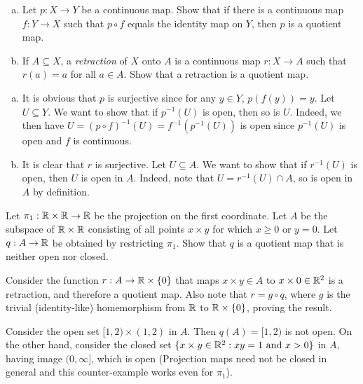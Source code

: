 	\setcounter{exercise}{1}
	\begin{exercise}
		\phantom{.}
		\begin{enumerate}[(a)]
			\item Let $p:X\to Y$ be a continuous map. Show that if there is a continuous map $f:Y\to X$ such that $p\circ f$ equals the identity map on $Y$, then $p$ is a quotient map.
			\item If $A\subseteq X$, a \textit{retraction} of $X$ onto $A$ is a continuous map $r:X\to A$ such that $r(a)=a$ for all $a\in A$. Show that a retraction is a quotient map.
		\end{enumerate}
	\end{exercise}
	\begin{solution*}
		\begin{enumerate}[(a)]
			\item It is obvious that $p$ is surjective since for any $y\in Y$, $p(f(y))=y$. Let $U\subseteq Y$. We want to show that if $p^{-1}(U)$ is open, then so is $U$. Indeed, we then have $U = (p\circ f)^{-1}(U) = f^{-1}(p^{-1}(U))$ is open since $p^{-1}(U)$ is open and $f$ is continuous.
			\item It is clear that $r$ is surjective. Let $U\subseteq A$. We want to show that if $r^{-1}(U)$ is open, then $U$ is open in $A$. Indeed, note that $U = r^{-1}(U) \cap A$, so is open in $A$ by definition.
		\end{enumerate}
	\end{solution*}

	\begin{exercise}
		Let $\pi_1:\mathbb{R}\times\mathbb{R}\to\mathbb{R}$ be the projection on the first coordinate. Let $A$ be the subspace of $\mathbb{R}\times\mathbb{R}$ consisting of all points $x\times y$ for which $x\geq 0$ or $y=0$. Let $q:A\to\mathbb{R}$ be obtained by restricting $\pi_1$. Show that $q$ is a quotient map that is neither open nor closed.
	\end{exercise}
	\begin{solution*}
		Consider the function $r:A\to \mathbb{R}\times\{0\}$ that maps $x\times y\in A$ to $x\times 0\in\mathbb{R}^2$ is a retraction, and therefore a quotient map. Also note that $r = g \circ q$, where $g$ is the trivial (identity-like) homemorphism from $\mathbb{R}$ to $\mathbb{R}\times\{0\}$, proving the result.

		Consider the open set $[1,2)\times(1,2)$ in $A$. Then $q(A) = [1,2)$ is not open. On the other hand, consider the closed set $\{x\times y\in\mathbb{R}^2 : xy=1\text{ and }x>0\}$ in $A$, having image $(0,\infty]$, which is open (Projection maps need not be closed in general and this counter-example works even for $\pi_1$).
	\end{solution*}

	
